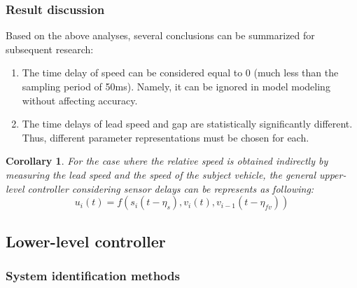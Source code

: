 \documentclass[journal]{IEEEtran}
\newtheorem{corollary}[theorem]{Corollary}
\begin{document}
\subsubsection{Result discussion}
\label{Section 3.2.3}

Based on the above analyses, several conclusions can be summarized for subsequent research:
\begin{enumerate}
  \item The time delay of speed can be considered equal to 0 (much less than the sampling period of 50ms). Namely, it can be ignored in model modeling without affecting accuracy.
  \item The time delays of lead speed and gap are statistically significantly different. Thus, different parameter representations must be chosen for each.
\end{enumerate}

\begin{corollary}
  For the case where the relative speed is obtained indirectly by measuring the lead
speed and the speed of the subject vehicle, the general upper-level controller considering sensor delays can be represents as following: 
\begin{equation}
  u_i\left(t\right)=f(s_i\left(t-\eta_s\right),v_i\left(t\right),v_{i-1}(t-\eta_{fv}))
  \label{Eq10}
\end{equation}
\end{corollary}



\subsection{Lower-level controller}
\label{Section 3.3}

\subsubsection{System identification methods}
\label{Section 3.3.1}
\end{document}
